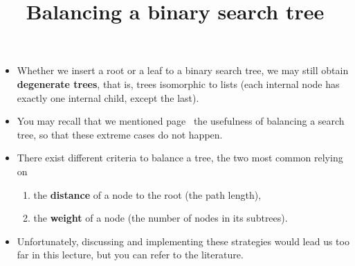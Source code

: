 \documentclass[wide]{slides}
\begin{document}
\begin{slide}
  \title{Balancing a binary search tree}

  \begin{itemize}

    \item Whether we insert a root or a leaf to a binary search tree,
      we may still obtain \textbf{degenerate trees}, that is, trees
      isomorphic to lists (each internal node has exactly one internal
      child, except the last).

    \item You may recall that we mentioned
      page~\pageref{slide:balanced} the usefulness of balancing a
      search tree, so that these extreme cases do not happen.

    \item There exist different criteria to balance a tree, the two
      most common relying on
      \begin{enumerate}

        \item the \textbf{distance} of a node to the root (the path
          length),

        \item the \textbf{weight} of a node (the number of nodes in
          its subtrees).

      \end{enumerate}

    \item Unfortunately, discussing and implementing these strategies
      would lead us too far in this lecture, but you can refer to the
      literature.

  \end{itemize}

\end{slide}
\end{document}

